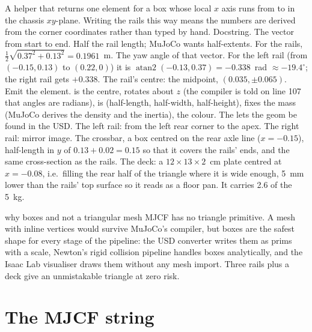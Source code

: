 \begin{explain}
 A helper that returns one  element for a box whose local
  $x$ axis runs from  to  in the chassis $xy$-plane.
  Writing the rails this way means the numbers are derived from the corner
  coordinates rather than typed by hand.
 Docstring.
 The vector from start to end.
 Half the rail length; MuJoCo wants half-extents. For the rails,
  $\tfrac12\sqrt{0.37^2+0.13^2} = 0.1961$~m.
 The yaw angle of that vector. For the left rail (from $(-0.15,
  0.13)$ to $(0.22, 0)$) it is $\operatorname{atan2}(-0.13, 0.37) =
  -0.338$~rad $\approx -19.4^\circ$; the right rail gets $+0.338$.
 The rail's centre: the midpoint, $(0.035, \pm0.065)$.
 Emit the element.  is the centre,  rotates about $z$ (the compiler is told on line 107 that angles are
  radians),  is (half-length, half-width, half-height),
   fixes the mass (MuJoCo derives the density and the inertia),
   the colour. The  lets the geom be found in the USD.
 The left rail: from the left rear corner to the apex.
 The right rail: mirror image.
 The crossbar, a box centred on the rear axle line
  ($x=-0.15$), half-length in $y$ of $0.13+0.02 = 0.15$ so that it covers
  the rails' ends, and the same cross-section as the rails.
 The deck: a $12\times13\times2$~cm plate centred at
  $x=-0.08$, i.e.\ filling the rear half of the triangle where it is wide
  enough, 5~mm lower than the rails' top surface so it reads as a floor pan.
  It carries 2.6 of the 5~kg.
\end{explain}

\begin{whybox}{why boxes and not a triangular mesh}
MJCF has no triangle primitive. A mesh with inline vertices would survive
MuJoCo's compiler, but boxes are the safest shape for every stage of the
pipeline: the USD converter writes them as  prims with a scale,
Newton's rigid collision pipeline handles boxes analytically, and the Isaac
Lab visualiser draws them without any mesh import. Three rails plus a deck
give an unmistakable triangle at zero risk.
\end{whybox}

\section{The MJCF string}

